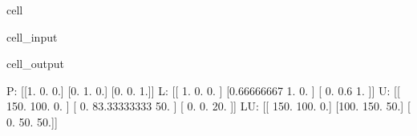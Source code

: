 \documentclass[letterpaper,10pt,english]{jupyterBook}
\begin{document}
\begin{sphinxuseclass}{cell}\begin{sphinxVerbatimInput}

\begin{sphinxuseclass}{cell_input}
\begin{sphinxVerbatim}[commandchars=\\\{\}]
   

    
 
 
 
 
\end{sphinxVerbatim}

\end{sphinxuseclass}\end{sphinxVerbatimInput}
\begin{sphinxVerbatimOutput}

\begin{sphinxuseclass}{cell_output}
\begin{sphinxVerbatim}[commandchars=\\\{\}]
P:
 [[1. 0. 0.]
 [0. 1. 0.]
 [0. 0. 1.]]
L:
 [[ 1.          0.          0.        ]
 [\PYGZhy{}0.66666667  1.          0.        ]
 [ 0.         \PYGZhy{}0.6         1.        ]]
U:
 [[ 150.         \PYGZhy{}100.            0.        ]
 [   0.           83.33333333  \PYGZhy{}50.        ]
 [   0.            0.           20.        ]]
LU:
 [[ 150. \PYGZhy{}100.    0.]
 [\PYGZhy{}100.  150.  \PYGZhy{}50.]
 [   0.  \PYGZhy{}50.   50.]]
\end{sphinxVerbatim}

\end{sphinxuseclass}\end{sphinxVerbatimOutput}

\end{sphinxuseclass}
\end{document}
